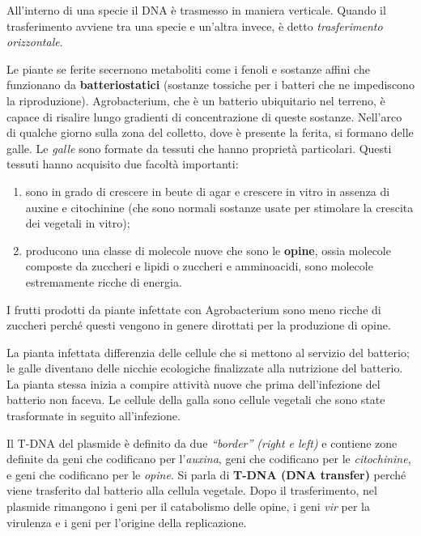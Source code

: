 \documentclass[]{article}
\begin{document}
All'interno di una specie il DNA è trasmesso in maniera verticale.
Quando il trasferimento avviene tra una specie e un'altra invece, è
detto \emph{trasferimento orizzontale}.

Le piante se ferite secernono metaboliti come i fenoli e sostanze affini
che funzionano da \textbf{batteriostatici} (sostanze tossiche per i
batteri che ne impediscono la riproduzione). Agrobacterium, che è un
batterio ubiquitario nel terreno, è capace di risalire lungo gradienti
di concentrazione di queste sostanze. Nell'arco di qualche giorno sulla
zona del colletto, dove è presente la ferita, si formano delle galle. Le
\emph{galle} sono formate da tessuti che hanno proprietà particolari.
Questi tessuti hanno acquisito due facoltà importanti:

\begin{enumerate}
\def\labelenumi{\arabic{enumi}.}
\itemsep1pt\parskip0pt
\item
  sono in grado di crescere in beute di agar e crescere in vitro in
  assenza di auxine e citochinine (che sono normali sostanze usate per
  stimolare la crescita dei vegetali in vitro);
\item
  producono una classe di molecole nuove che sono le \textbf{opine},
  ossia molecole composte da zuccheri e lipidi o zuccheri e amminoacidi,
  sono molecole estremamente ricche di energia.
\end{enumerate}

I frutti prodotti da piante infettate con Agrobacterium sono meno ricche
di zuccheri perché questi vengono in genere dirottati per la produzione
di opine.

La pianta infettata differenzia delle cellule che si mettono al servizio
del batterio; le galle diventano delle nicchie ecologiche finalizzate
alla nutrizione del batterio. La pianta stessa inizia a compire attività
nuove che prima dell'infezione del batterio non faceva. Le cellule della
galla sono cellule vegetali che sono state trasformate in seguito
all'infezione.

Il T-DNA del plasmide è definito da due \emph{``border'' (right e left)}
e contiene zone definite da geni che codificano per l'\emph{auxina},
geni che codificano per le \emph{citochinine}, e geni che codificano per
le \emph{opine}. Si parla di \textbf{T-DNA (DNA transfer)} perché viene
trasferito dal batterio alla cellula vegetale. Dopo il trasferimento,
nel plasmide rimangono i geni per il catabolismo delle opine, i geni
\emph{vir} per la virulenza e i geni per l'origine della replicazione.
\end{document}
